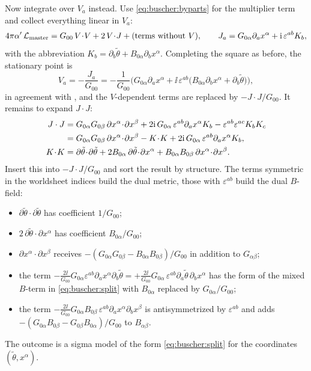 Now integrate over $V_a$ instead. Use \eqref{eq:buscher:byparts} for the multiplier term and
collect everything linear in $V_a$:
\begin{equation}\label{eq:buscher:J}
 4\pi\alpha'\,\mathcal L_{\rm master}=G_{00}\,V\!\cdot\! V+2\,V\!\cdot\! J+(\text{terms without }V),
 \qquad
 J_a=G_{0\alpha}\partial_ax^\alpha+\mathrm{i}\,\varepsilon^{ab}K_b ,
\end{equation}
with the abbreviation $K_b=\partial_b\tilde\theta+B_{0\alpha}\partial_bx^\alpha$. Completing
the square as before, the stationary point is
\begin{equation}\label{eq:buscher:Vsol}
 V_a=-\frac{J_a}{G_{00}}
 =-\frac{1}{G_{00}}\Big(G_{0\alpha}\partial_ax^\alpha
   +\ii\,\varepsilon^{ab}\big(B_{0\alpha}\partial_bx^\alpha+\partial_b\tilde\theta\big)\Big),
\end{equation}
in agreement with , and the $V$-dependent terms
are replaced by $-J\cdot J/G_{00}$. It remains to expand $J\cdot J$:
\begin{align}
 J\cdot J&=G_{0\alpha}G_{0\beta}\,\partial x^\alpha\!\cdot\!\partial x^\beta
  +2\ii\,G_{0\alpha}\,\varepsilon^{ab}\partial_ax^\alpha K_b
  -\varepsilon^{ab}\varepsilon^{ac}K_bK_c\notag\\
 &=G_{0\alpha}G_{0\beta}\,\partial x^\alpha\!\cdot\!\partial x^\beta
  -K\!\cdot\! K+2\ii\,G_{0\alpha}\,\varepsilon^{ab}\partial_ax^\alpha K_b ,
  \label{eq:buscher:JJ}\\
 K\!\cdot\! K&=\partial\tilde\theta\!\cdot\!\partial\tilde\theta
  +2B_{0\alpha}\,\partial\tilde\theta\!\cdot\!\partial x^\alpha
  +B_{0\alpha}B_{0\beta}\,\partial x^\alpha\!\cdot\!\partial x^\beta .\notag
\end{align}
Insert this into $-J\cdot J/G_{00}$ and sort the result by structure. The terms symmetric in
the worldsheet indices build the dual metric, those with $\varepsilon^{ab}$ build the dual
$B$-field:
\begin{itemize}[leftmargin=*,itemsep=1pt]
\item $\partial\tilde\theta\cdot\partial\tilde\theta$ has coefficient $1/G_{00}$;
\item $2\,\partial\tilde\theta\cdot\partial x^\alpha$ has coefficient $B_{0\alpha}/G_{00}$;
\item $\partial x^\alpha\cdot\partial x^\beta$ receives
 $-(G_{0\alpha}G_{0\beta}-B_{0\alpha}B_{0\beta})/G_{00}$ in addition to $G_{\alpha\beta}$;
\item the term $-\frac{2\ii}{G_{00}}G_{0\alpha}\varepsilon^{ab}\partial_ax^\alpha
 \partial_b\tilde\theta=+\frac{2\ii}{G_{00}}G_{0\alpha}\,\varepsilon^{ab}
 \partial_a\tilde\theta\,\partial_bx^\alpha$ has the form of the mixed $B$-term in
 \eqref{eq:buscher:split} with $B_{0\alpha}$ replaced by $G_{0\alpha}/G_{00}$;
\item the term $-\frac{2\ii}{G_{00}}G_{0\alpha}B_{0\beta}\,\varepsilon^{ab}
 \partial_ax^\alpha\partial_bx^\beta$ is antisymmetrized by $\varepsilon^{ab}$ and adds
 $-(G_{0\alpha}B_{0\beta}-G_{0\beta}B_{0\alpha})/G_{00}$ to $B_{\alpha\beta}$.
\end{itemize}
The outcome is a sigma model of the form \eqref{eq:buscher:split} for the coordinates
$(\tilde\theta,x^\alpha)$.

